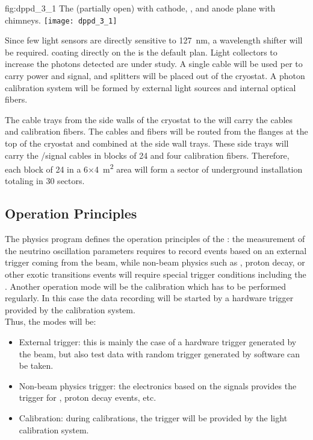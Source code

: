 \begin{dunefigure}{fig:dppd_3_1}
{The  (partially open) with cathode, ,  and anode plane with chimneys.}
\texttt{[image: dppd\_3\_1]}
\end{dunefigure}

Since few light sensors are directly sensitive to \SI{127}{nm}, a wavelength shifter will be required.  coating directly on the  is the default plan. Light collectors to increase the photons detected are under study. A single cable will be used per  to carry power and signal, and splitters will be placed out of the cryostat. A photon calibration system will be formed by external light sources and internal optical fibers.  

The cable trays from the side walls of the cryostat to the  will carry the cables and calibration fibers. The cables and fibers will be routed from the \fdth flanges at the top of the cryostat and  combined at the side wall trays. These side trays will carry the /signal cables in blocks of \num{24}  and four calibration fibers. Therefore, each block of \num{24}  in a \num{6}$\times$\SI{4}{m^2} area will form a sector of underground installation totaling in \num{30} sectors.

\subsection{Operation Principles}
\label{sec:fddp-pd-1.5}

The physics program defines the operation principles of the : the measurement of the neutrino oscillation parameters requires to record events based on an external trigger coming from the beam, while non-beam physics such as  , proton decay, or other exotic transitions events will require special trigger conditions including the . Another operation mode will be the  calibration which has to be performed regularly. In this case the data recording will be started by a hardware trigger provided by the calibration system. \\    

Thus, the modes will be:
\begin{itemize}
\item External trigger: this is mainly the case of a hardware trigger generated by the beam, but also test data with random trigger generated by software can be taken. 
\item Non-beam physics trigger: the electronics based on the  signals provides the trigger for  , proton decay events, etc.
\item Calibration: during  calibrations, the trigger will be provided by the light calibration system.
\end{itemize}

